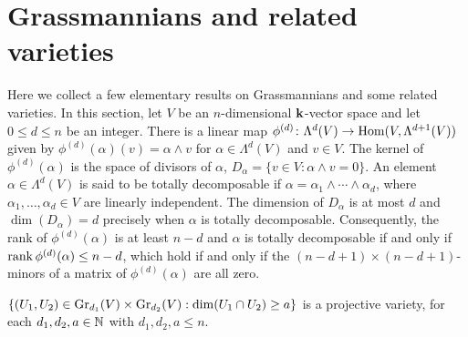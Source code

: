 \documentclass[a4paper, 11pt]{report}
\begin{document}
\section{Grassmannians and related varieties}

Here we collect a few elementary results on Grassmannians and some related varieties. In this section, let $V$ be an $n$-dimensional $\field$-vector space and let $0\le d\le n$ be an integer. There is a linear map $\phi^{(d)}\colon\Lambda^d(V)\to\HOM(V,\Lambda^{d+1}(V))$ given by $\phi^{(d)}(\alpha)(v)=\alpha\wedge v$ for $\alpha\in\Lambda^d(V)$ and $v\in V$. The kernel of $\phi^{(d)}(\alpha)$ is the space of divisors of $\alpha$, $D_\alpha=\{v\in V:\alpha\wedge v=0\}$. An element $\alpha\in\Lambda^d(V)$ is said to be totally decomposable if $\alpha = \alpha_1\wedge\cdots\wedge\alpha_d$, where $\alpha_1,\ldots,\alpha_d\in V$ are linearly independent. The dimension of $D_\alpha$ is at most $d$ and $\dim(D_\alpha)=d$ precisely when $\alpha$ is totally decomposable. Consequently, the rank of $\phi^{(d)}(\alpha)$ is at least $n-d$ and $\alpha$ is totally decomposable if and only if $\rank{\phi^{(d)}(\alpha)}\le n-d$, which hold if and only if the $(n-d+1)\times(n-d+1)$-minors of a matrix of $\phi^{(d)}(\alpha)$ are all zero.

\begin{lemma}\label{lemma:grassmannian-incidence-varieties}
$\{(U_1,U_2)\in\GR[d_1]{V}\times\GR[d_2]{V}: \dim(U_1\cap U_2)\geq a\}$ is a projective variety, for each $d_1,d_2,a\in\naturals$ with $d_1,d_2,a\le n$.
\end{lemma}
\end{document}
